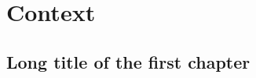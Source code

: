\documentclass[a4paper,
	10pt
	]{memoir}       %
\begin{document}
\newpage \pagestyle{ruled}


\part[\textsc{Context}]{Context}
	
	

\chapter[First Chapter]{Long title of the first chapter}
	\label{chap:1}
	


\appendix

\printbibliography[title=General bibliography]

\newpage


\end{document}
